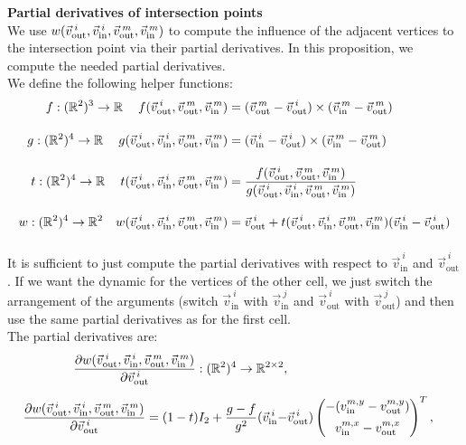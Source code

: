 \begin{proposition} \textbf{Partial derivatives of intersection points} \\
	We use $w(\vargs)$ to compute the influence of the adjacent vertices to the intersection point via their partial derivatives.
	In this proposition, we compute the needed partial derivatives. \\
	We define the following helper functions:
	\begin{align*}
		f: (\R^2)^3 \rightarrow \R^{\:} \quad f(\vec{v}_{\text{out}}^{\: i}, \vec{v}_{\text{out}}^{\: m}, \vec{v}_{\text{in}}^{\: m}) &= \tu \\[1em]
		g: (\R^2)^4 \rightarrow \R^{\:} \quad g(\vargs) &= \tl\\[1em]
		t: (\R^2)^4 \rightarrow \R^{\:} \quad t(\vargs) &= \dfrac{f(\vec{v}_{\text{out}}^{\: i}, \vec{v}_{\text{out}}^{\: m}, \vec{v}_{\text{in}}^{\: m})}{g(\vargs)} \\[1em]
		w: (\R^2)^4 \rightarrow \R^2 \quad w(\vargs) &= \vec{v}_{\text{out}}^{\: i} + t(\vargs)(\vec{v}_{\text{in}}^{\: i} - \vec{v}_{\text{out}}^{\: i}) \\[1em]
	\end{align*}
	It is sufficient to just compute the partial derivatives with respect to $\vec{v}_{\text{in}}^{\: i}$ and $\vec{v}_{\text{out}}^{\: i}$.
	If we want the dynamic for the vertices of the other cell, we just switch the arrangement of the arguments (switch $\vec{v}_{\text{in}}^{\: i}$ with $\vec{v}_{\text{in}}^{\: j}$ and $\vec{v}_{\text{out}}^{\: i}$ with $\vec{v}_{\text{out}}^{\: j}$) and then use the same partial derivatives as for the first cell. \\
	The partial derivatives are: 
	\begin{align}
		\begin{split}
			\dfrac{\partial w(\vargs)}{\partial \vec{v}_{\text{out}}^{\: i}}: (\R^2)^4 \rightarrow \R^{2 \times 2}, \\[0.5em]
			\dfrac{\partial w(\vargs)}{\partial \vec{v}_{\text{out}}^{\: i}} = (1-t)I_2 + \dfrac{g - f}{g^2}(\vec{v}_{\text{in}}^{\: i} - &\vec{v}_{\text{out}}^{\: i}) \begin{pmatrix}
			-(v_{\text{in}}^{m, y} - v_{\text{out}}^{m, y}) \\[0.5em]
			 v_{\text{in}}^{m, x} - v_{\text{out}}^{m, x}
		\end{pmatrix}^T,
		\end{split}
		\label{equ:dwv_out}
	\end{align}


\end{proposition}
